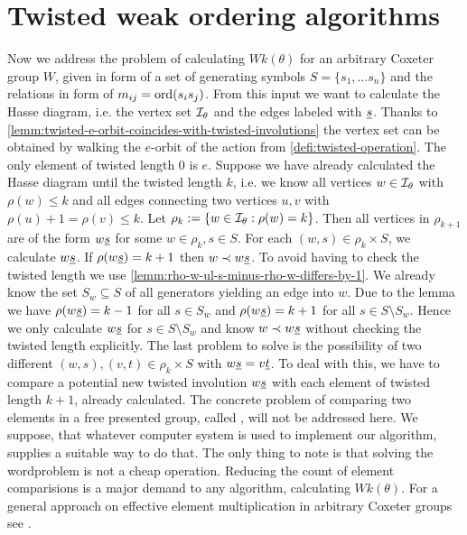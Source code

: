 \section{Twisted weak ordering algorithms}
\label{sec:twisted-involutions-algorithms}

Now we address the problem of calculating $Wk(\theta)$ for an arbitrary Coxeter group $W$, given in form of a set of generating symbols $S = \{s_1, \ldots s_n\}$ and the relations in form of $m_{ij} = \operatorname{ord}(s_i s_j)$. From this input we want to calculate the Hasse diagram, i.e. the vertex set $\mathcal{I}_{\theta}$ and the edges labeled with $\underline{s}$. Thanks to \ref{lemm:twisted-e-orbit-coincides-with-twisted-involutions} the vertex set can be obtained by walking the $e$-orbit of the action from \ref{defi:twisted-operation}. The only element of twisted length 0 is $e$. Suppose we have already calculated the Hasse diagram until the twisted length $k$, i.e. we know all vertices $w \in \mathcal{I}_{\theta}$ with $\rho(w) \leq k$ and all edges connecting two vertices $u,v$ with $\rho(u) + 1 = \rho(v) \leq k$. Let $\rho_k := \{ w \in \mathcal{I}_{\theta} : \rho(w) = k \}$. Then all vertices in $\rho_{k+1}$ are of the form $w \underline{s}$ for some $w \in \rho_k, s \in S$. For each $(w,s) \in \rho_k \times S$, we calculate $w \underline{s}$. If $\rho(w \underline{s}) = k + 1$ then $w \prec w \underline{s}$. To avoid having to check the twisted length we use \ref{lemm:rho-w-ul-s-minus-rho-w-differs-by-1}. We already know the set $S_w \subseteq S$ of all generators yielding an edge into $w$. Due to the lemma we have $\rho(w \underline{s}) = k - 1$ for all $s \in S_w$ and $\rho(w \underline{s}) = k + 1$ for all $s \in S \setminus S_w$. Hence we only calculate $w \underline{s}$ for $s \in S \setminus S_w$ and know $w \prec w \underline{s}$ without checking the twisted length explicitly. The last problem to solve is the possibility of two different $(w,s),(v,t) \in \rho_k \times S$ with $w \underline{s} = v \underline{t}$. To deal with this, we have to compare a potential new twisted involution $w \underline{s}$ with each element of twisted length $k+1$, already calculated. The concrete problem of comparing two elements in a free presented group, called , will not be addressed here. We suppose, that whatever computer system is used to implement our algorithm, supplies a suitable way to do that. The only thing to note is that solving the wordproblem is not a cheap operation. Reducing the count of element comparisions is a major demand to any algorithm, calculating $Wk(\theta)$. For a general approach on effective element multiplication in arbitrary Coxeter groups see \cite{casselman:coxeter-multiplication-i,casselman:coxeter-multiplication-ii}.

